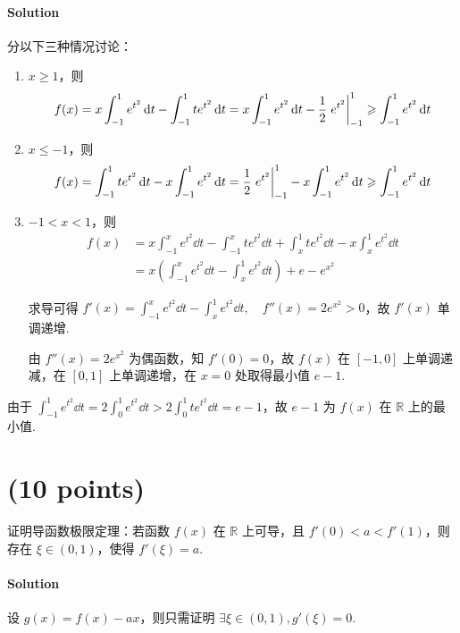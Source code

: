 \documentclass{ctexart}
\begin{document}
\paragraph{Solution}
    分以下三种情况讨论：
    \begin{enumerate}
        \item $x \geqslant 1$，则
        \[
            f(x) = x\int_{-1}^1 e^{t^2} \dd{t} - \int_{-1}^1 te^{t^2} \dd{t}
                            = x\int_{-1}^1 e^{t^2} \dd{t} - \frac{1}{2} \eval{e^{t^2}}_{-1}^1
                            \geqslant \int_{-1}^1 e^{t^2} \dd{t}
        \]
        \item $x \leqslant -1$，则
        \[
            f(x) = \int_{-1}^1 te^{t^2} \dd{t} - x\int_{-1}^1 e^{t^2} \dd{t}
                            = \frac{1}{2} \eval{e^{t^2}}_{-1}^1 - x\int_{-1}^1 e^{t^2} \dd{t}
                            \geqslant \int_{-1}^1 e^{t^2} \dd{t}
        \]
        \item $-1<x<1$，则
        \begin{align*}
            f(x) &= x\int_{-1}^x e^{t^2} \dd{t} - \int_{-1}^x te^{t^2} \dd{t} + \int_x^1 te^{t^2} \dd{t} - x\int_x^1 e^{t^2} \dd{t} \\
                    &= x \left(\int_{-1}^x e^{t^2}\dd{t} - \int_x^1 e^{t^2}\dd{t} \right) + e - e^{x^2}
        \end{align*}

        求导可得 $f'(x) = \displaystyle\int_{-1}^x e^{t^2}\dd{t} - \int_x^1 e^{t^2}\dd{t},\quad f''(x)=2e^{x^2}>0$，故 $f'(x)$ 单调递增.

        由 $f''(x)=2e^{x^2}$ 为偶函数，知 $f'(0)=0$，故 $f(x)$ 在 $[-1,0]$ 上单调递减，在 $[0,1]$ 上单调递增，在 $x=0$ 处取得最小值 $e-1$.
    \end{enumerate}

    由于 $\displaystyle\int_{-1}^1 e^{t^2} \dd{t} = 2\int_0^1 e^{t^2} \dd{t} > 2\int_0^1 te^{t^2} \dd{t} = e-1$，故 $e-1$ 为 $f(x)$ 在 $\mathbb{R}$ 上的最小值.

\section{(10 points)}
    证明导函数极限定理：若函数 $f(x)$ 在 $\mathbb{R}$ 上可导，且 $f'(0)<a<f'(1)$，则存在 $\xi \in (0,1)$，使得 $f'(\xi)=a$.
\paragraph{Solution}
    设 $g(x)=f(x)-ax$，则只需证明 $\exists \xi \in (0,1), g'(\xi)=0$.
\end{document}
